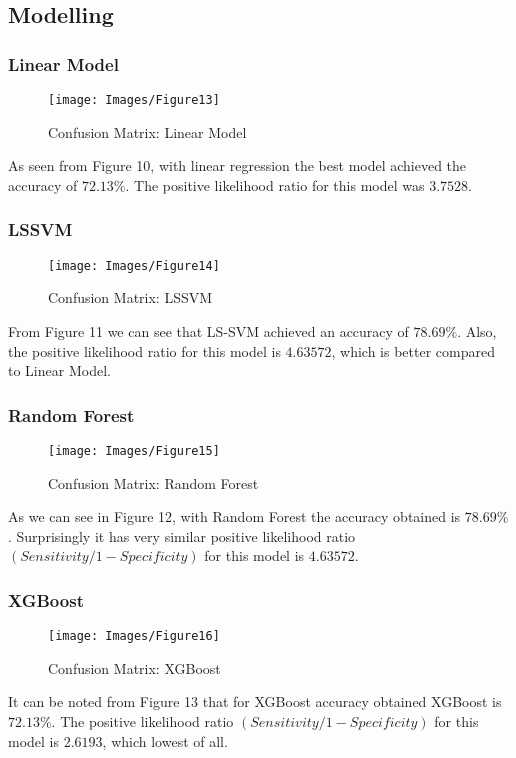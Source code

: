 \documentclass[11pt]{article}
\begin{document}
\begin{multicols}{2}
    \subsection{Modelling}
    \subsubsection{Linear Model}
    \begin{figure}[H]
        \centering
        \vspace{-15pt}
        \texttt{[image: Images/Figure13]}
        \vspace{-10pt}
        \caption{Confusion Matrix: Linear Model}
    \end{figure} 
    As seen from Figure 10, with linear regression the best model achieved the accuracy of $72.13\%$. The positive likelihood ratio for this model was $3.7528$.
    \subsubsection{LSSVM}
    \begin{figure}[H]
        \centering
        \texttt{[image: Images/Figure14]}
        \vspace{-10pt}
        \caption{Confusion Matrix: LSSVM}
    \end{figure} 
    From Figure 11 we can see that LS-SVM achieved an accuracy of $78.69\%$. Also, the positive likelihood ratio for this model is $4.63572$, which is better compared to Linear Model. 
    \subsubsection{Random Forest }
    \begin{figure}[H]
        \centering
        \texttt{[image: Images/Figure15]}
        \vspace{-10pt}
        \caption{Confusion Matrix: Random Forest}
    \end{figure} 
    As we can see in Figure 12, with Random Forest the accuracy obtained is $78.69\%$. Surprisingly it has very similar positive likelihood ratio $(Sensitivity/1-Specificity)$ for this model is $4.63572.$ 
    \subsubsection{XGBoost}
    \begin{figure}[H]
        \centering
        \texttt{[image: Images/Figure16]}
        \vspace{-10pt}
        \caption{Confusion Matrix: XGBoost}
    \end{figure} 
    It can be noted from Figure 13 that for XGBoost accuracy obtained XGBoost is $72.13\%$. The positive likelihood ratio $(Sensitivity/1 - Specificity)$ for this model is $2.6193$, which lowest of all.


\end{multicols}
\end{document}
